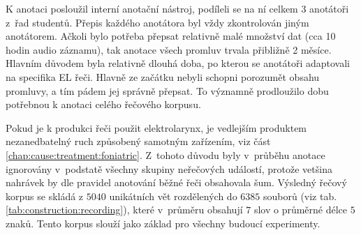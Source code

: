 K anotaci posloužil interní anotační nástroj, podíleli se na ní celkem 3 anotátoři z~řad studentů.
Přepis každého anotátora byl vždy zkontrolován jiným anotátorem.
Ačkoli bylo potřeba přepsat relativně malé množství dat (cca 10 hodin audio záznamu), tak anotace všech promluv trvala přibližně 2 měsíce.
Hlavním důvodem byla relativně dlouhá doba, po kterou se anotátoři adaptovali na specifika EL řeči.
Hlavně ze začátku nebyli schopni porozumět obsahu promluvy, a tím pádem jej správně přepsat.
To významně prodloužilo dobu potřebnou k anotaci celého řečového korpusu.

Pokud je k produkci řeči použit elektrolarynx, je vedlejším produktem nezanedbatelný ruch způsobený samotným zařízením, viz část \ref{chap:cause:treatment:foniatric}.
Z~tohoto důvodu byly v~průběhu anotace ignorovány v~podstatě všechny skupiny neřečových událostí, protože vetšina nahrávek by dle pravidel anotování běžné řeči obsahovala šum.
Výsledný řečový korpus se skládá z $5040$ unikátních vět rozdělených do $6385$ souborů (viz tab. \ref{tab:construction:recording}), které v~průměru obsahují $7$ slov o průměrné délce $5$ znaků. Tento korpus slouží jako základ pro všechny budoucí experimenty.
